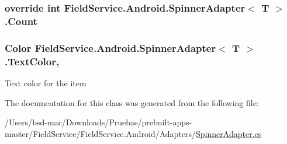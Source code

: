 \hypertarget{class_field_service_1_1_android_1_1_spinner_adapter_3_01_t_01_4_a7c3b6905d5485342af38739eb3a6368c}{
\subsubsection[{Count}]{\setlength{\rightskip}{0pt plus 5cm}override int Field\+Service.\+Android.\+Spinner\+Adapter$<$ T $>$.Count\hspace{0.3cm}{\ttfamily [get]}}}\label{class_field_service_1_1_android_1_1_spinner_adapter_3_01_t_01_4_a7c3b6905d5485342af38739eb3a6368c}
\hypertarget{class_field_service_1_1_android_1_1_spinner_adapter_3_01_t_01_4_adcdd717eea6385eab23eab4134e1ffc5}{
\subsubsection[{Text\+Color}]{\setlength{\rightskip}{0pt plus 5cm}Color Field\+Service.\+Android.\+Spinner\+Adapter$<$ T $>$.Text\+Color\hspace{0.3cm}{\ttfamily [get]}, {\ttfamily [set]}}}\label{class_field_service_1_1_android_1_1_spinner_adapter_3_01_t_01_4_adcdd717eea6385eab23eab4134e1ffc5}


Text color for the item 



The documentation for this class was generated from the following file\+:\begin{DoxyCompactItemize}
\item 
/\+Users/bsd-\/mac/\+Downloads/\+Pruebas/prebuilt-\/apps-\/master/\+Field\+Service/\+Field\+Service.\+Android/\+Adapters/\hyperlink{_spinner_adapter_8cs}{Spinner\+Adapter.\+cs}\end{DoxyCompactItemize}
